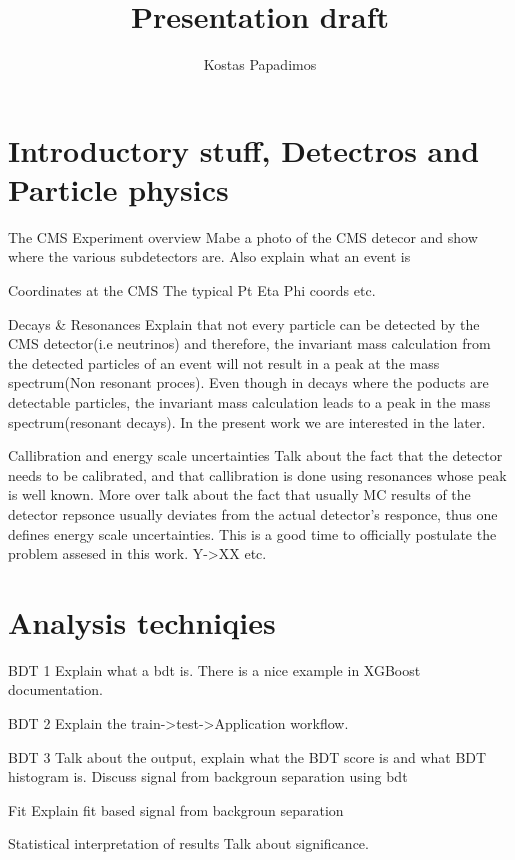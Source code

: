 \documentclass[bigger]{beamer}
\author{Kostas Papadimos}
\date{}
\title{Presentation draft}
\begin{document}
\maketitle

\section{Introductory stuff, Detectros and Particle physics}
\label{sec:org47999e8}
\begin{frame}[label={sec:org8f7a5cd}]{The CMS Experiment overview}
Mabe a photo of the CMS detecor and show where the various subdetectors are. Also explain what an event is
\end{frame}
\begin{frame}[label={sec:org2ecabf0}]{Coordinates at the CMS}
The typical Pt Eta Phi coords etc.
\end{frame}
\begin{frame}[label={sec:orgc6be592}]{Decays \& Resonances}
Explain that not every particle can be detected by the CMS detector(i.e neutrinos) and therefore, the invariant mass calculation from the detected particles of an event will not result in a peak at the mass spectrum(Non resonant proces). Even though in decays where  the poducts are detectable particles, the invariant mass calculation leads to a peak in the mass spectrum(resonant decays). In the present work we are interested in the later.
\end{frame}
\begin{frame}[label={sec:org1a8a2e2}]{Callibration and energy scale uncertainties}
Talk about the fact that the detector needs to be calibrated, and that callibration is done using resonances whose peak is well known. More over talk about the fact that usually MC results of the detector repsonce usually deviates from the actual detector's responce, thus one defines energy scale uncertainties. This is a good time to officially postulate the problem assesed in  this work. Y->XX etc. 
\end{frame}
\section{Analysis techniqies}
\label{sec:org550f924}
\begin{frame}[label={sec:org111c06b}]{BDT 1}
Explain what a bdt is. There is a nice example in XGBoost documentation. 
\end{frame}
\begin{frame}[label={sec:org7231688}]{BDT 2}
Explain the train->test->Application workflow. 
\end{frame}
\begin{frame}[label={sec:orgfa9383a}]{BDT 3}
Talk about the output, explain what the BDT score is and what BDT histogram is. Discuss signal from backgroun separation using bdt
\end{frame}
\begin{frame}[label={sec:orga439f55}]{Fit}
Explain fit based signal from backgroun separation
\end{frame}
\begin{frame}[label={sec:orge140f2d}]{Statistical interpretation of results}
Talk about significance.
\end{frame}
\end{document}
